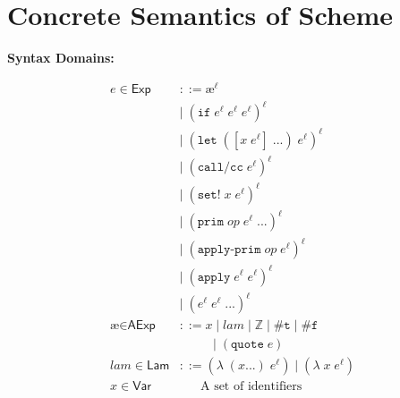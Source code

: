 \documentclass[12pt,draft]{article}
\newcommand\mae{\ensuremath{\text{\ae}}}
\newcommand{\lamsyn}[2]{(\lambda\;(#1 ...)\;#2)}
\newcommand{\vararglamsyn}[2]{(\lambda\;#1\;#2)}
\newcommand{\letsyn}[3]{(\texttt{let}\;([#1\;#2]\;...)\;#3)}
\newcommand{\ifsyn}[3]{(\texttt{if}\;#1\;#2\;#3)}
\newcommand{\primsyn}[2]{(\texttt{prim}\;#1\;#2\;...)}
\newcommand{\applyprimsyn}[2]{(\texttt{apply-prim}\;#1\;#2)}
\newcommand{\applysyn}[2]{(\texttt{apply}\;#1\;#2)}
\newcommand{\callccsyn}[1]{(\texttt{call/cc}\;#1)}
\newcommand{\setsyn}[2]{(\texttt{set!}\;#1\;#2)}
\newcommand{\quotesyn}[1]{(\texttt{quote}\;#1)}
\newcommand{\truesyn}{\texttt{\#t}}
\newcommand{\falsesyn}{\texttt{\#f}}
\begin{document}


\section{Concrete Semantics of Scheme}

{\footnotesize
\begin{multicols*}{2}
\begin{center}
\textbf{Syntax Domains:}
\end{center}
\vspace{-16mm}
\begin{center}
\begin{align*}
  e \in \textsf{Exp} &::= \mae^\ell \\
                     &|\; \ifsyn{e^\ell}{e^\ell}{e^\ell}^\ell \\
                     &|\; \letsyn{x}{e^\ell}{e^\ell}^\ell \\
                     &|\; \callccsyn{e^\ell}^\ell \\
                     &|\; \setsyn{x}{e^\ell}^\ell \\
                     &|\; \primsyn{op}{e^\ell}^\ell \\
                     &|\; \applyprimsyn{op}{e^\ell}^\ell \\
                     &|\; \applysyn{e^\ell}{e^\ell}^\ell \\
                     &|\; (e^\ell\;e^\ell\;...)^\ell \\
  \mae \in \textsf{AExp} &::= x\;|\; lam\;|\; \mathbb{Z}
                           \;|\; \truesyn \;|\; \falsesyn \\
                   &\;\;\;\;\;\;\;\;\;\, |\; \quotesyn{e} \\
  lam \in \textsf{Lam} &::= \lamsyn{x}{e^\ell} \;|\; \vararglamsyn{x}{e^\ell} \\
  x \in \textsf{Var} &\;\;\;\;\;\; \text{A set of identifiers} \\

\end{align*}
\end{center}
\end{multicols*}}
\end{document}
